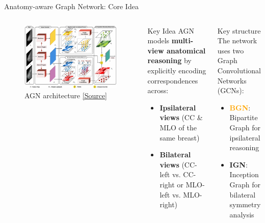 \documentclass[8pt,aspectratio=169,xcolor=dvipsnames]{beamer}
\begin{document}
\begin{frame}{Anatomy-aware Graph Network: Core Idea}
\begin{columns}
        \begin{figure}
        \centering
        \includegraphics[width=\linewidth]{AGN.png}
        \caption{AGN architecture \href{https://arxiv.org/abs/2105.10160}{[Source]}}
        \label{fig:enter-label}
    \end{figure}

    \begin{block}{Key Idea}
    AGN models \textbf{multi-view anatomical reasoning} by explicitly encoding correspondences across:
    \begin{itemize}
        \item \textbf{Ipsilateral views} (CC \& MLO of the same breast)
        \item \textbf{Bilateral views} (CC-left vs. CC-right or MLO-left vs. MLO-right)
    \end{itemize}
    \end{block}

    \begin{block}{Key structure}
    The network uses two Graph Convolutional Networks (GCNs):
    \begin{itemize}
        \item \textcolor{orange}{\textbf{BGN}}: Bipartite Graph for ipsilateral reasoning
        \item \textcolor{ign}{\textbf{IGN}}: Inception Graph for bilateral symmetry analysis
    \end{itemize}
    \end{block}
\end{columns}
\end{frame}
\end{document}

